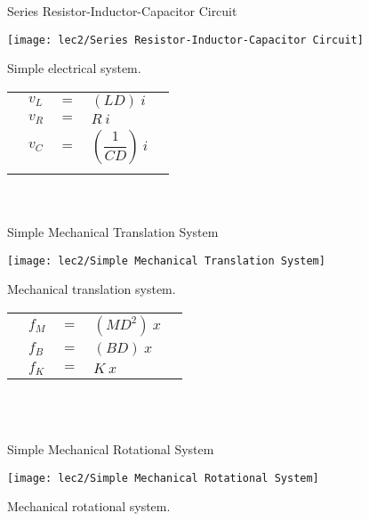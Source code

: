 Series Resistor-Inductor-Capacitor Circuit\\[-1mm]
\begin{marginfigure}[-1em]
		\texttt{[image: lec2/Series Resistor-Inductor-Capacitor Circuit]}
		\caption{Simple electrical system.}
\end{marginfigure}

\begin{tabular}{C{1mm} C{1mm} C{2cm} l l}
			&$v_L$& $=$ & $(LD)\ i$ &\\
			&$v_R$& $=$ & $R\ i$	&\\
			&$v_C$& $=$ & $(\dfrac{1}{CD})\ i$&\\
			&&&&
\end{tabular}

\vspace{-4em}
\hspace*{\fill}\\[+2mm]
\\[-1em]


Simple Mechanical Translation System\\[-1mm]
\begin{marginfigure}[-1em]
		\texttt{[image: lec2/Simple Mechanical Translation System]}
		\caption{Mechanical translation system.}
\end{marginfigure}

\begin{tabular}{C{1mm} C{1mm} C{2cm} l l}
			&$f_M$& $=$ & $(MD^2)\ x$ &\\
			&$f_B$& $=$ & $(BD)\ x$	&\\
			&$f_K$& $=$ & $K\ x$&\\
\end{tabular}

\vspace{-1em}
\hspace*{\fill}\\[+2mm]
\\

\pagebreak

Simple Mechanical Rotational System\\[-1mm]
\begin{marginfigure}[-1em]
		\texttt{[image: lec2/Simple Mechanical Rotational System]}
		\caption{Mechanical rotational system.}
\end{marginfigure}

